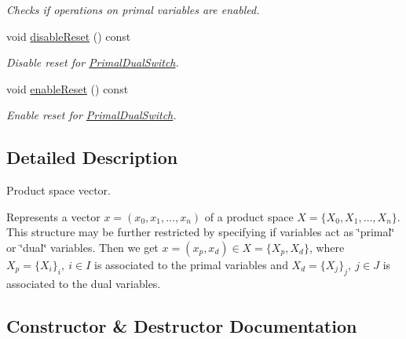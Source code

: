 \begin{DoxyCompactItemize}
\begin{DoxyCompactList}\small\item\em Checks if operations on primal variables are enabled. \end{DoxyCompactList}\item 
\hypertarget{classSpacy_1_1Mixin_1_1PrimalDualSwitch_a17fdb03a417a4aa78056a7f8d67b261d}{}void \hyperlink{classSpacy_1_1Mixin_1_1PrimalDualSwitch_a17fdb03a417a4aa78056a7f8d67b261d}{disable\+Reset} () const \label{classSpacy_1_1Mixin_1_1PrimalDualSwitch_a17fdb03a417a4aa78056a7f8d67b261d}

\begin{DoxyCompactList}\small\item\em Disable reset for \hyperlink{classSpacy_1_1Mixin_1_1PrimalDualSwitch}{Primal\+Dual\+Switch}. \end{DoxyCompactList}\item 
\hypertarget{classSpacy_1_1Mixin_1_1PrimalDualSwitch_a501ff6346350ca171c676ccff41e8f2e}{}void \hyperlink{classSpacy_1_1Mixin_1_1PrimalDualSwitch_a501ff6346350ca171c676ccff41e8f2e}{enable\+Reset} () const \label{classSpacy_1_1Mixin_1_1PrimalDualSwitch_a501ff6346350ca171c676ccff41e8f2e}

\begin{DoxyCompactList}\small\item\em Enable reset for \hyperlink{classSpacy_1_1Mixin_1_1PrimalDualSwitch}{Primal\+Dual\+Switch}. \end{DoxyCompactList}\end{DoxyCompactItemize}


\subsection{Detailed Description}
Product space vector. 

Represents a vector $x=(x_0,x_1,\ldots,x_n)$ of a product space $X = \{X_0,X_1,\ldots,X_n\}$. This structure may be further restricted by specifying if variables act as \char`\"{}primal\char`\"{} or \char`\"{}dual\char`\"{} variables. Then we get $ x = (x_p,x_d) \in X=\{ X_p, X_d \}$, where $X_p=\{X_i\}_i,\ i\in I $ is associated to the primal variables and $X_d=\{X_j\}_j,\ j\in J$ is associated to the dual variables. 

\subsection{Constructor \& Destructor Documentation}
\hypertarget{classSpacy_1_1ProductSpace_1_1Vector_a1ca3c013b545d16d761bdba57a7d599b_a1ca3c013b545d16d761bdba57a7d599b}{}
